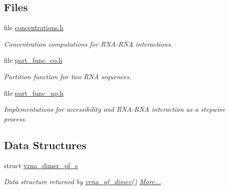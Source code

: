 \subsection*{Files}
\begin{DoxyCompactItemize}
\item 
file \mbox{\hyperlink{concentrations_8h}{concentrations.\+h}}
\begin{DoxyCompactList}\small\item\em Concentration computations for R\+N\+A-\/\+R\+NA interactions. \end{DoxyCompactList}\item 
file \mbox{\hyperlink{part__func__co_8h}{part\+\_\+func\+\_\+co.\+h}}
\begin{DoxyCompactList}\small\item\em Partition function for two R\+NA sequences. \end{DoxyCompactList}\item 
file \mbox{\hyperlink{part__func__up_8h}{part\+\_\+func\+\_\+up.\+h}}
\begin{DoxyCompactList}\small\item\em Implementations for accessibility and R\+N\+A-\/\+R\+NA interaction as a stepwise process. \end{DoxyCompactList}\end{DoxyCompactItemize}
\subsection*{Data Structures}
\begin{DoxyCompactItemize}
\item 
struct \mbox{\hyperlink{group__pf__cofold_structvrna__dimer__pf__s}{vrna\+\_\+dimer\+\_\+pf\+\_\+s}}
\begin{DoxyCompactList}\small\item\em Data structure returned by \mbox{\hyperlink{group__pf__cofold_ga4e5c7d06c302a7c59fc0d64dc142ca63}{vrna\+\_\+pf\+\_\+dimer()}}  \mbox{\hyperlink{group__pf__cofold_structvrna__dimer__pf__s}{More...}}\end{DoxyCompactList}\end{DoxyCompactItemize}
